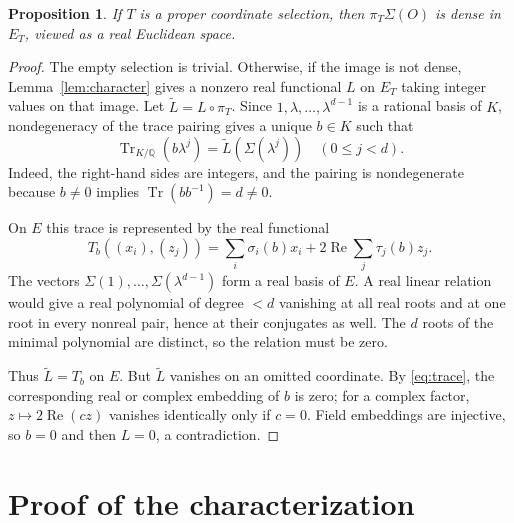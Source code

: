 \documentclass[11pt]{article}
\newtheorem{proposition}[theorem]{Proposition}
\newcommand{\Q}{\mathbb Q}
\DeclareMathOperator{\Tr}{Tr}
\begin{document}
\begin{proposition}\label{prop:density}
If $T$ is a proper coordinate selection, then $\pi_T\Sigma(O)$
is dense in $E_T$, viewed as a real Euclidean space.
\end{proposition}
\begin{proof}
The empty selection is trivial. Otherwise, if the image is not dense,
Lemma~\ref{lem:character} gives a nonzero real functional $L$ on $E_T$
taking integer values on that image. Let $\widetilde L=L\circ\pi_T$.
Since $1,\lambda,\ldots,\lambda^{d-1}$ is a rational basis of $K$,
nondegeneracy of the trace pairing gives a unique $b\in K$ such that
\[
 \Tr_{K/\Q}(b\lambda^j)=\widetilde L(\Sigma(\lambda^j))
 \quad(0\le j<d).
\]
Indeed, the right-hand sides are integers, and the pairing is nondegenerate
because $b\ne0$ implies $\Tr(b b^{-1})=d\ne0$.

On $E$ this trace is represented by the real functional
\begin{equation}\label{eq:trace}
 T_b((x_i),(z_j))=
 \sum_i\sigma_i(b)x_i+2\operatorname{Re}\sum_j\tau_j(b)z_j.
\end{equation}
The vectors $\Sigma(1),\ldots,\Sigma(\lambda^{d-1})$ form a real
basis of $E$. A real linear relation would give a real polynomial of
degree $<d$ vanishing at all real roots and at one root in every nonreal
pair, hence at their conjugates as well. The $d$ roots of the minimal
polynomial are distinct, so the relation must be zero.

Thus $\widetilde L=T_b$ on $E$. But $\widetilde L$ vanishes on an
omitted coordinate. By \eqref{eq:trace}, the corresponding real or
complex embedding of $b$ is zero; for a complex factor,
$z\mapsto2\operatorname{Re}(cz)$ vanishes identically only if $c=0$.
Field embeddings are injective, so $b=0$ and then $L=0$, a contradiction.
\end{proof}

\section{Proof of the characterization}
\end{document}

